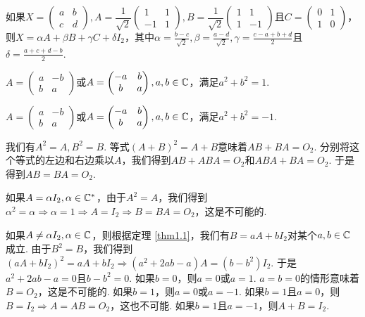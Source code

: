 \begin{solution}
  如果$X=\begin{pmatrix}
    a & b \\
    c & d
  \end{pmatrix},A=\dfrac1{\sqrt2}\begin{pmatrix}
    1 & 1 \\
    -1 & 1
  \end{pmatrix},B=\dfrac1{\sqrt2}\begin{pmatrix}
    1 & 1 \\
    1 & -1
  \end{pmatrix}$且$C=\begin{pmatrix}
    0 & 1 \\
    1 & 0
  \end{pmatrix}$，则$X=\alpha A+\beta B+\gamma C+\delta I_2$，其中$\alpha=\frac{b-c}{\sqrt2},\beta=\frac{a-d}{\sqrt2},\gamma=\frac{c-a+b+d}2$且
  $\delta=\frac{a+c+d-b}2$.
\end{solution}

\begin{solution}
  \begin{enuma}
    \item $A=\begin{pmatrix}
      a & -b \\
      b & a
    \end{pmatrix}$或$A=\begin{pmatrix}
      -a & b \\
      b & a
    \end{pmatrix},a,b\in\mathbb C$，满足$a^2+b^2=1$.
    \item $A=\begin{pmatrix}
      a & -b \\
      b & a
    \end{pmatrix}$或$A=\begin{pmatrix}
      -a & b \\
      b & a
    \end{pmatrix},a,b\in\mathbb C$，满足$a^2+b^2=-1$.
  \end{enuma}
\end{solution}

\setcounter{solution}{18}
\begin{solution}
  我们有$A^2=A,B^2=B$. 等式$(A+B)^2=A+B$意味着$AB+BA=O_2$. 分别将这个等式的左边和右边乘以$A$，我们得到$AB+ABA=O_2$和$ABA+BA=O_2$. 于是得到$AB=BA=O_2$.

  如果$A=\alpha I_2,\alpha\in\mathbb C^\ast$，由于$A^2=A$，我们得到$\alpha^2=\alpha\Rightarrow \alpha=1\Rightarrow A=I_2\Rightarrow B=BA=O_2$，这是不可能的.

  如果$A\ne\alpha I_2,\alpha\in\mathbb C$，则根据定理  \ref{thm1.1}，我们有$B=aA+bI_2$对某个$a,b\in\mathbb C$成立. 由于$B^2=B$，我们得到$(aA+bI_2)^2=aA+bI_2\Rightarrow(a^2+2ab-a)A=(b-b^2)I_2$. 于是$a^2+2ab-a=0$且$b-b^2=0$. 如果$b=0$，则$a=0$或$a=1$. $a=b=0$的情形意味着$B=O_2$，这是不可能的. 如果$b=1$，则$a=0$或$a=-1$. 如果$b=1$且$a=0$，则$B=I_2\Rightarrow A=AB=O_2$，这也不可能. 如果$b=1$且$a=-1$，则$A+B=I_2$.
\end{solution}

